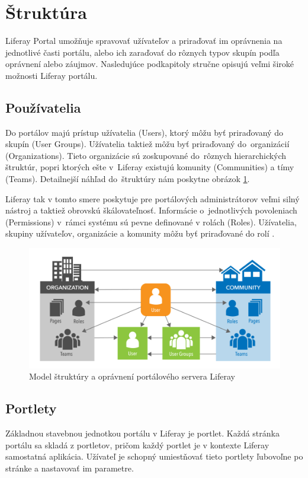 \documentclass[
  printed, %
  twoside, %
  notable,   %
  nolof,   %
  nolot,   %
]{fithesis3}
\begin{document}
\section{Štruktúra}
Liferay Portal umožňuje spravovať užívateľov a priraďovať im oprávnenia na jednotlivé časti portálu, alebo ich zaraďovať do rôznych typov skupín podľa oprávnení alebo záujmov. Nasledujúce podkapitoly stručne opisujú veľmi široké možnosti Liferay portálu.

\subsection{Používatelia}
\label{liferay_users}
Do portálov majú prístup užívatelia (Users), ktorý môžu byť priraďovaný do skupín (User Groups). Užívatelia taktiež môžu byť priraďovaný do~organizácií (Organizations). Tieto organizácie sú zoskupované do~rôznych hierarchických štruktúr, popri ktorých ešte v~Liferay existujú komunity (Communities) a tímy (Teams). Detailnejší náhľad do~štruktúry nám poskytne obrázok \ref{liferay_structure}.

Liferay tak v tomto smere poskytuje pre portálových administrátorov veľmi silný nástroj a taktiež obrovskú škálovateľnosť. Informácie o~jednotlivých povoleniach (Permissions) v~rámci systému sú pevne definované v rolách (Roles). Užívatelia, skupiny užívateľov, organizácie a komunity môžu byť priraďované do rolí \cite{sezov2010portal}.

\begin{figure}[H]
	\center
	\includegraphics[width=1.0\linewidth]{liferay_structure}
	\caption{Model štruktúry a oprávnení portálového servera Liferay \cite{sezov2010portal}}
	\label{liferay_structure}
\end{figure}

\subsection{Portlety}
\label{portlets}
Základnou stavebnou jednotkou portálu v Liferay je portlet. Každá stránka portálu sa skladá z portletov, pričom každý portlet je v kontexte Liferay samostatná aplikácia. Užívateľ je schopný umiestňovať tieto portlety ľubovoľne po stránke a nastavovať im parametre.
\end{document}
